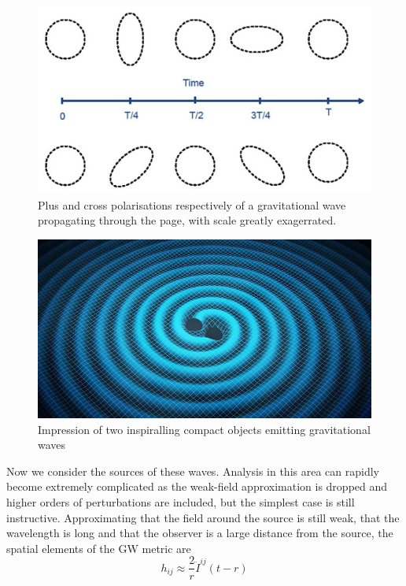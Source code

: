 \documentclass[11pt]{article}
\begin{document}
\begin{figure}[H]
	\includegraphics[scale=0.60]{fig1.jpg}
	\centering
	\caption{\cite{fig1}Plus and cross polarisations respectively of a gravitational wave propagating through the page, with scale greatly exagerrated.}
	\centering
\end{figure}
\begin{figure}[H]
	\includegraphics[scale=0.60]{fig2.jpg}
	\centering
	\caption{\cite{fig2}Impression of two inspiralling compact objects emitting gravitational waves}
	\centering
\end{figure}
Now we consider the sources of these waves. Analysis in this area can rapidly become extremely complicated as the weak-field approximation is dropped and higher orders of perturbations are included\cite{blanch}, but the simplest case is still instructive.
Approximating that the field around the source is still weak, that the wavelength is long and that the observer is a large distance from the source, the spatial elements of the GW metric are
\begin{equation}
h_{ij}\approx\frac{2}{r}\ddot{I}^{ij}(t-r)
\end{equation}
\end{document}
